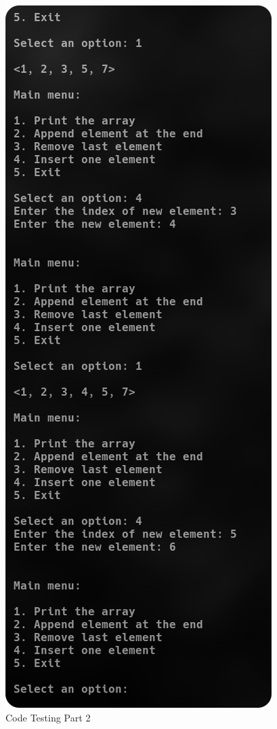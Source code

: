 \documentclass[
	letterpaper, %
	10pt, %
]{CSUniSchoolLabReport}
\begin{document}
\begin{figure}[H]
  \centering
  \includegraphics[height=.75\textheight]{Figures/6_4-5.png}
  \caption{Code Testing Part 2}
  \label{fig:10}
\end{figure}
\end{document}
